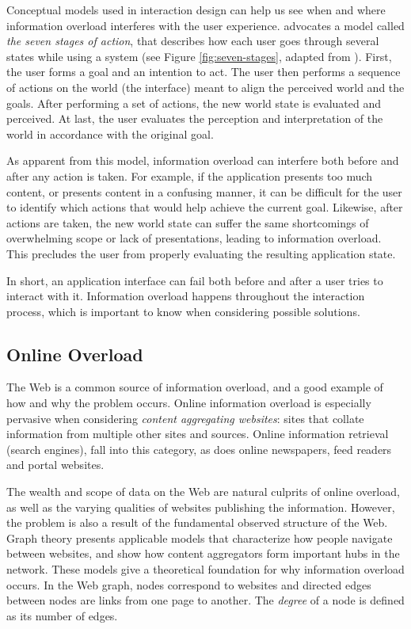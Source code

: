 Conceptual models used in interaction design can help us see when and where information overload interferes with the user experience. 
\cite{Norman1988} advocates a model called \emph{the seven stages of action}, 
that describes how each user goes through several states while using a system
(see Figure \ref{fig:seven-stages}, adapted from \citeauthor{Norman1988}). 
First, the user forms a goal and an intention to act. The user then performs a sequence of actions on the world (the interface)
 meant to align the perceived world and the goals. After performing a set of actions, the new world state is evaluated and perceived. 
At last, the user evaluates the perception and interpretation of the world in accordance with the original goal.

As apparent from this model, information overload can interfere both before and after any action is taken. 
For example, if the application presents too much content, or presents content in a confusing manner, 
it can be difficult for the user to identify which actions that would help achieve the current goal. 
Likewise, after actions are taken, the new world state can suffer the same shortcomings of overwhelming scope or lack of presentations, 
leading to information overload. 
This precludes the user from properly evaluating the resulting application state. 

In short, an application interface can fail both before and after a user tries to interact with it.
Information overload happens throughout the interaction process, which is important to know when considering possible solutions.

\subsection{Online Overload}

The Web is a common source of information overload, 
and a good example of how and why the problem occurs.
Online information overload is especially pervasive when considering \emph{content aggregating websites}:
sites that collate information from multiple other sites and sources. 
Online information retrieval (search engines), fall into this category, as does
online newspapers, feed readers and portal websites.

The wealth and scope of data on the Web are natural culprits of online overload, 
as well as the varying qualities of websites publishing the information. 
However, the problem is also a result of the fundamental observed structure of the Web.
Graph theory presents applicable models that characterize how people navigate between websites, 
and show how content aggregators form important hubs in the network. 
These models give a theoretical foundation for why information overload occurs.
In the Web graph, nodes correspond to websites and
directed edges between nodes are links from one page to another. The \emph{degree} of a node is defined as its number of edges.

